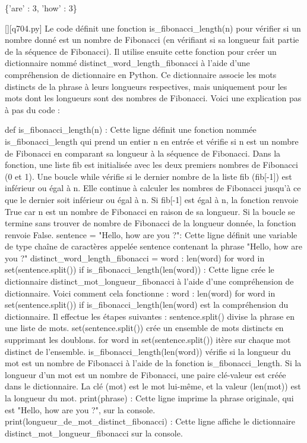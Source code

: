 \{'are' : 3, 'how' : 3\}
        \par
        \begin{solution}
            \renewcommand{\nomfichier}{q704.py}
            \pythonfile{\chemincode \nomfichier}[][\nomfichier]
            Le code définit une fonction is_fibonacci_length(n) pour vérifier si un nombre donné est un nombre de Fibonacci (en vérifiant si sa longueur fait partie de la séquence de Fibonacci). Il utilise ensuite cette fonction pour créer un dictionnaire nommé distinct_word_length_fibonacci à l'aide d'une compréhension de dictionnaire en Python. Ce dictionnaire associe les mots distincts de la phrase à leurs longueurs respectives, mais uniquement pour les mots dont les longueurs sont des nombres de Fibonacci. Voici une explication pas à pas du code :

    def is_fibonacci_length(n) : Cette ligne définit une fonction nommée is_fibonacci_length qui prend un entier n en entrée et vérifie si n est un nombre de Fibonacci en comparant sa longueur à la séquence de Fibonacci.
        Dans la fonction, une liste fib est initialisée avec les deux premiers nombres de Fibonacci (0 et 1).
        Une boucle while vérifie si le dernier nombre de la liste fib (fib[-1]) est inférieur ou égal à n. Elle continue à calculer les nombres de Fibonacci jusqu'à ce que le dernier soit inférieur ou égal à n.
        Si fib[-1] est égal à n, la fonction renvoie True car n est un nombre de Fibonacci en raison de sa longueur.
        Si la boucle se termine sans trouver de nombre de Fibonacci de la longueur donnée, la fonction renvoie False.
    sentence = "Hello, how are you ?": Cette ligne définit une variable de type chaîne de caractères appelée sentence contenant la phrase "Hello, how are you ?"
    distinct_word_length_fibonacci = {word : len(word) for word in set(sentence.split()) if is_fibonacci_length(len(word))} : Cette ligne crée le dictionnaire distinct_mot_longueur_fibonacci à l'aide d'une compréhension de dictionnaire. Voici comment cela fonctionne :
        {word : len(word) for word in set(sentence.split()) if is_fibonacci_length(len(word)} est la compréhension du dictionnaire. Il effectue les étapes suivantes :
        sentence.split() divise la phrase en une liste de mots.
        set(sentence.split()) crée un ensemble de mots distincts en supprimant les doublons.
        for word in set(sentence.split()) itère sur chaque mot distinct de l'ensemble.
        is_fibonacci_length(len(word)) vérifie si la longueur du mot est un nombre de Fibonacci à l'aide de la fonction is_fibonacci_length.
        Si la longueur d'un mot est un nombre de Fibonacci, une paire clé-valeur est créée dans le dictionnaire. La clé (mot) est le mot lui-même, et la valeur (len(mot)) est la longueur du mot.
    print(phrase) : Cette ligne imprime la phrase originale, qui est "Hello, how are you ?", sur la console.
    print(longueur_de_mot_distinct_fibonacci) : Cette ligne affiche le dictionnaire distinct_mot_longueur_fibonacci sur la console.
        \end{solution}
        

